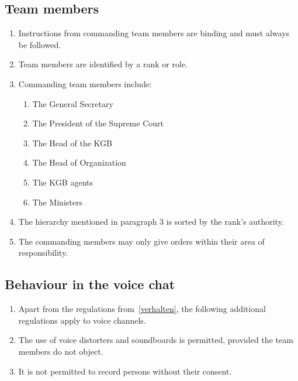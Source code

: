 \documentclass{article}
\begin{document}
\subsection{Team members}\label{members}
\begin{enumerate}[(1)]
	\item Instructions from commanding team members are binding and must always be followed.
	\item Team members are identified by a rank or role.
	\item Commanding team members include:
	\begin{enumerate}
		\item The General Secretary
		\item The President of the Supreme Court
		\item The Head of the KGB
		\item The Head of Organization
		\item The KGB agents
		\item The Ministers
	\end{enumerate}
    \item The hierarchy mentioned in paragraph 3 is sorted by the rank's authority.
	\item The commanding members may only give orders within their area of responsibility.
\end{enumerate}

\subsection{Behaviour in the voice chat}
\begin{enumerate}[(1)]
    \item Apart from the regulations from~\ref{verhalten}, the following additional regulations apply to voice channels.
	\item The use of voice distorters and soundboards is permitted, provided the team members do not object.
	\item It is not permitted to record persons without their consent.
\end{enumerate}
\end{document}
